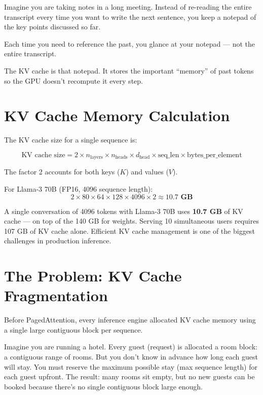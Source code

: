 \documentclass[10pt, oneside, openany]{book}
\newcommand{\warnbox}[2]{\begin{tcolorbox}[warnstyle, title={#1}]#2\end{tcolorbox}}
\newcommand{\analogybox}[2]{\begin{tcolorbox}[analogystyle, title={Analogy: #1}]#2\end{tcolorbox}}
\begin{document}
\analogybox{The Meeting Notes}{
Imagine you are taking notes in a long meeting.  Instead of re-reading the entire
transcript every time you want to write the next sentence, you keep a notepad of
the key points discussed so far.

Each time you need to reference the past, you glance at your notepad --- not the
entire transcript.

The KV cache is that notepad.  It stores the important ``memory'' of past tokens so
the GPU doesn't recompute it every step.
}

\section{KV Cache Memory Calculation}

The KV cache size for a single sequence is:

\[
  \text{KV cache size} = 2 \times n_\text{layers} \times n_\text{heads} \times
  d_\text{head} \times \text{seq\_len} \times \text{bytes\_per\_element}
\]

The factor 2 accounts for both keys ($K$) and values ($V$).

For Llama-3 70B (FP16, 4096 sequence length):
\[
  2 \times 80 \times 64 \times 128 \times 4096 \times 2 \approx \mathbf{10.7\text{ GB}}
\]

\warnbox{Memory Shock}{
A single conversation of 4096 tokens with Llama-3 70B uses \textbf{10.7 GB} of KV
cache --- on top of the 140 GB for weights.  Serving 10 simultaneous users requires
107 GB of KV cache alone.  Efficient KV cache management is one of the biggest
challenges in production inference.
}

\section{The Problem: KV Cache Fragmentation}

Before PagedAttention, every inference engine allocated KV cache memory using
a single large contiguous block per sequence.

Imagine you are running a hotel.  Every guest (request) is allocated a room block:
a contiguous range of rooms.  But you don't know in advance how long each guest
will stay.  You must reserve the maximum possible stay (max sequence length) for
each guest upfront.  The result: many rooms sit empty, but no new guests can be
booked because there's no single contiguous block large enough.
\end{document}
